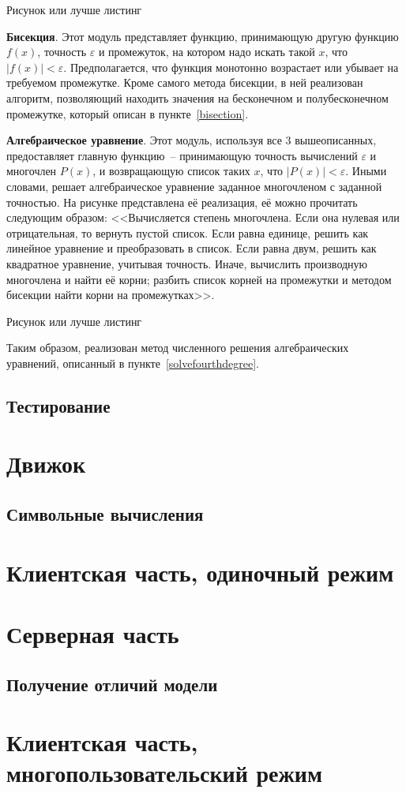 \TODO Рисунок или лучше листинг

\textbf{Бисекция}. Этот модуль представляет функцию, принимающую другую функцию \(f(x)\), точность \(\varepsilon\)
и промежуток, на котором надо искать такой \(x\), что \(\left|f(x)\right| < \varepsilon\). Предполагается, что
функция монотонно возрастает или убывает на требуемом промежутке. Кроме самого метода бисекции, в ней реализован алгоритм,
позволяющий находить значения на бесконечном и полубесконечном промежутке, который описан в пункте~\ref{bisection}.

\textbf{Алгебраическое уравнение}. Этот модуль, используя все 3 вышеописанных, предоставляет главную функцию~-- принимающую
точность вычислений \(\varepsilon\) и многочлен \(P(x)\), и возвращающую список таких \(x\), что \(\left|P(x)\right| < \varepsilon\).
Иными словами, решает алгебраическое уравнение заданное многочленом с заданной точностью. На рисунке \TODO представлена её реализация, её можно прочитать следующим образом:
<<Вычисляется степень многочлена.
Если она нулевая или отрицательная, то вернуть пустой список.
Если равна единице, решить как линейное уравнение и преобразовать в список.
Если равна двум, решить как квадратное уравнение, учитывая точность.
Иначе, вычислить производную многочлена и найти её корни; разбить список корней на промежутки и методом бисекции найти корни на промежутках>>.

\TODO Рисунок или лучше листинг

Таким образом, реализован метод численного решения алгебраических уравнений, описанный в пункте~\ref{solvefourthdegree}. 

\subsection{Тестирование}

\TODO

\section{Движок}\label{engine}

\TODO

\subsection{Символьные вычисления}\label{expr}

\TODO

\section{Клиентская часть, одиночный режим}

\TODO

\section{Серверная часть}

\subsection{Получение отличий модели}\label{model-diff-implementation}

\TODO

\section{Клиентская часть, многопользовательский режим}

\TODO
